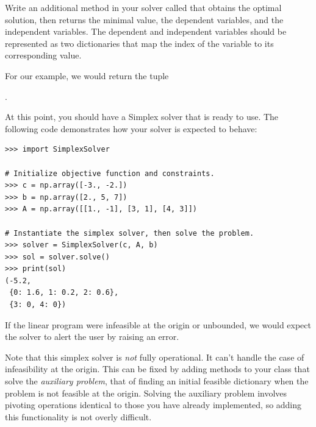 \begin{problem}
Write an additional method in your solver called  that obtains the optimal solution, then returns the minimal value, the dependent variables, and the independent variables.
The dependent and independent variables should be represented as two dictionaries that map the index of the variable to its corresponding value.

For our example, we would return the tuple

.
\end{problem}

\vspace{5mm}

At this point, you should have a Simplex solver that is ready to use.
The following code demonstrates how your solver is expected to behave:

\vspace{5mm}

\begin{lstlisting}
>>> import SimplexSolver

# Initialize objective function and constraints.
>>> c = np.array([-3., -2.])
>>> b = np.array([2., 5, 7])
>>> A = np.array([[1., -1], [3, 1], [4, 3]])

# Instantiate the simplex solver, then solve the problem.
>>> solver = SimplexSolver(c, A, b)
>>> sol = solver.solve()
>>> print(sol)
(-5.2,
 {0: 1.6, 1: 0.2, 2: 0.6},
 {3: 0, 4: 0})
\end{lstlisting}

If the linear program were infeasible at the origin or unbounded, we would expect the solver to alert the user by raising an error.

Note that this simplex solver is \emph{not} fully operational.
It can't handle the case of infeasibility at the origin.
This can be fixed by adding methods to your class that solve the \emph{auxiliary problem}, that of finding an initial feasible dictionary when the problem is not feasible at the origin.
Solving the auxiliary problem involves pivoting operations identical to those you have already implemented, so adding this functionality
is not overly difficult.

